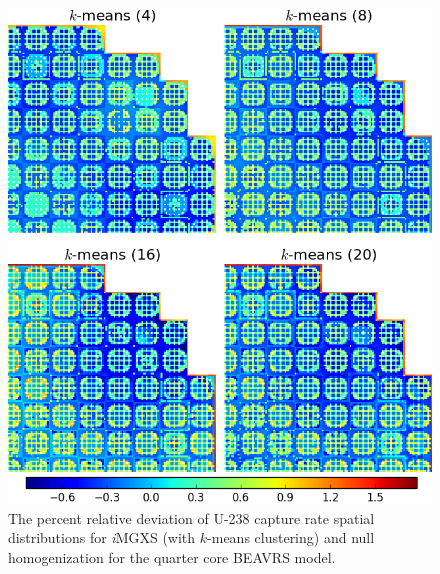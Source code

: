 \begin{figure}[h!]
\centering
\includegraphics[width=0.9\linewidth]{figures/results/compare/full-core/compare-capt-kmeans}
\vspace{2mm}
\caption[U-238 capture rate \textit{i}MGXS-to-null relative deviations]{The percent relative deviation of U-238 capture rate spatial distributions for \textit{i}\ac{MGXS} (with $k$-means clustering) and null homogenization for the quarter core BEAVRS model.}
\label{fig:chap11-full-core-capt-rates-kmeans-comp}
\end{figure}

\clearpage

